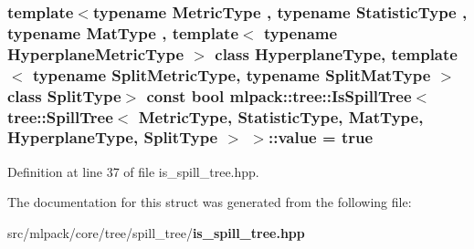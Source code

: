 \subsubsection[{value}]{\setlength{\rightskip}{0pt plus 5cm}template$<$typename Metric\+Type , typename Statistic\+Type , typename Mat\+Type , template$<$ typename Hyperplane\+Metric\+Type $>$ class Hyperplane\+Type, template$<$ typename Split\+Metric\+Type, typename Split\+Mat\+Type $>$ class Split\+Type$>$ const bool {\bf mlpack\+::tree\+::\+Is\+Spill\+Tree}$<$ {\bf tree\+::\+Spill\+Tree}$<$ Metric\+Type, Statistic\+Type, Mat\+Type, Hyperplane\+Type, Split\+Type $>$ $>$\+::value = true\hspace{0.3cm}{\ttfamily [static]}}\label{structmlpack_1_1tree_1_1IsSpillTree_3_01tree_1_1SpillTree_3_01MetricType_00_01StatisticType_00_0d41f2b10e451850b8eb14d3156c51340_af7f9ffa810ebd81eedae158317a8c631}


Definition at line 37 of file is\+\_\+spill\+\_\+tree.\+hpp.



The documentation for this struct was generated from the following file\+:\begin{DoxyCompactItemize}
\item 
src/mlpack/core/tree/spill\+\_\+tree/{\bf is\+\_\+spill\+\_\+tree.\+hpp}\end{DoxyCompactItemize}
